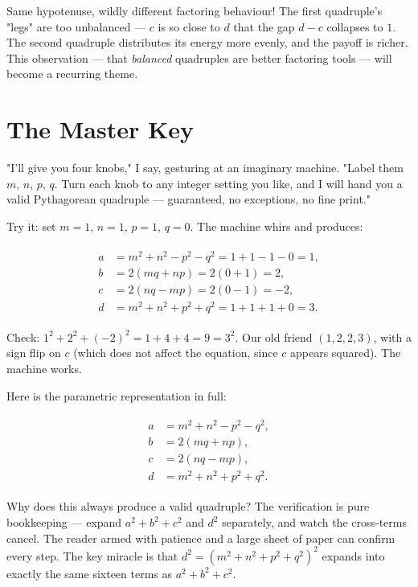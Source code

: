 \documentclass[11pt,twoside,openright]{book}
\theoremstyle{definition}
\theoremstyle{remark}
\begin{document}
Same hypotenuse, wildly different factoring behaviour! The first quadruple's "legs" are too unbalanced --- $c$ is so close to $d$ that the gap $d - c$ collapses to $1$. The second quadruple distributes its energy more evenly, and the payoff is richer. This observation --- that \textit{balanced} quadruples are better factoring tools --- will become a recurring theme.



\section{The Master Key}

"I'll give you four knobs," I say, gesturing at an imaginary machine. "Label them $m$, $n$, $p$, $q$. Turn each knob to any integer setting you like, and I will hand you a valid Pythagorean quadruple --- guaranteed, no exceptions, no fine print."

Try it: set $m = 1$, $n = 1$, $p = 1$, $q = 0$. The machine whirs and produces:

\begin{align*}
\begin{aligned}
a &= m^2 + n^2 - p^2 - q^2 = 1 + 1 - 1 - 0 = 1, \\
b &= 2(mq + np) = 2(0 + 1) = 2, \\
c &= 2(nq - mp) = 2(0 - 1) = -2, \\
d &= m^2 + n^2 + p^2 + q^2 = 1 + 1 + 1 + 0 = 3.
\end{aligned}
\end{align*}

Check: $1^2 + 2^2 + (-2)^2 = 1 + 4 + 4 = 9 = 3^2$. Our old friend $(1, 2, 2, 3)$, with a sign flip on $c$ (which does not affect the equation, since $c$ appears squared). The machine works.

Here is the parametric representation in full:

\begin{align*}
\boxed{\begin{aligned}
a &= m^2 + n^2 - p^2 - q^2, \\
b &= 2(mq + np), \\
c &= 2(nq - mp), \\
d &= m^2 + n^2 + p^2 + q^2.
\end{aligned}}
\end{align*}

Why does this always produce a valid quadruple? The verification is pure bookkeeping --- expand $a^2 + b^2 + c^2$ and $d^2$ separately, and watch the cross-terms cancel. The reader armed with patience and a large sheet of paper can confirm every step. The key miracle is that $d^2 = (m^2 + n^2 + p^2 + q^2)^2$ expands into exactly the same sixteen terms as $a^2 + b^2 + c^2$.
\end{document}
